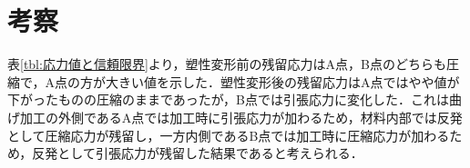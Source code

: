\section{考察}
表\ref{tbl:応力値と信頼限界}より，塑性変形前の残留応力はA点，B点のどちらも圧縮で，A点の方が大きい値を示した．塑性変形後の残留応力はA点ではやや値が下がったものの圧縮のままであったが，B点では引張応力に変化した．これは曲げ加工の外側であるA点では加工時に引張応力が加わるため，材料内部では反発として圧縮応力が残留し，一方内側であるB点では加工時に圧縮応力が加わるため，反発として引張応力が残留した結果であると考えられる．

